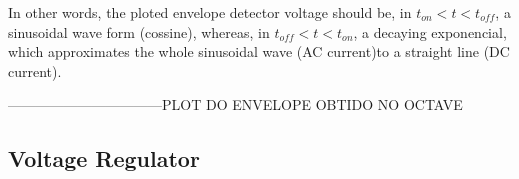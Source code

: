 In other words, the ploted envelope detector voltage should be, in $t_{on} < t < t_{off}$, a sinusoidal wave form (cossine), whereas, in $t_{off} < t < t_{on}$, a decaying exponencial, which approximates the whole sinusoidal wave (AC current)to a straight line (DC current).


---------------------------------PLOT DO ENVELOPE OBTIDO NO OCTAVE

\subsection{Voltage Regulator}



